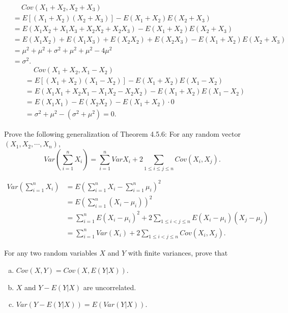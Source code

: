 \documentclass[14pt]{elegantbook}
\begin{document}
    \begin{solution}
        \begin{align*}
            &\quad\ Cov(X_1 + X_2, X_2 + X_3)\\&=E[(X_1 + X_2)(X_2 + X_3)]-E(X_1 + X_2)E(X_2 + X_3)\\
            &=E(X_1X_2 + X_1X_3 + X_2X_2 + X_2X_3)-E(X_1 + X_2)E(X_2 + X_3)\\
            &=E(X_1X_2) + E(X_1X_3) + E(X_2X_2) + E(X_2X_3) - E(X_1 + X_2)E(X_2 + X_3)\\
            &=\mu^2+\mu^2+\sigma^2+\mu^2+\mu^2-4\mu^2\\
            &=\sigma^2.
        \end{align*}
        \begin{align*}
            &\quad\ Cov(X_1 + X_2, X_1 - X_2)\\
            &=E[(X_1 + X_2)(X_1 - X_2)]-E(X_1 + X_2)E(X_1 - X_2)\\
            &=E(X_1X_1 + X_2X_1 - X_1X_2 - X_2X_2) - E(X_1 + X_2)E(X_1 - X_2)\\
            &=E(X_1X_1) - E(X_2X_2) - E(X_1 + X_2)\cdot 0\\
            &=\sigma^2+\mu^2-(\sigma^2+\mu^2)=0. 
        \end{align*}
    \end{solution}


    \setcounter{exer}{43}
    \begin{exercise}
        Prove the following generalization of Theorem 4.5.6: For any random vector $(X_1, X_2, \cdots, X_n)$, 
        \[Var\left(\sum_{i=1}^nX_i\right)=\sum_{i=1}^nVar X_i+2\sum_{1\leq i\leq j\leq n}Cov(X_i, X_j). \]
    \end{exercise}

    \begin{solution}
        \begin{align*}
            Var\left(\sum_{i=1}^n X_i\right)&=E\left(\sum_{i=1}^n X_i-\sum_{i=1}^n\mu_i\right)^2\\
            &=E\left(\sum_{i=1}^n (X_i-\mu_i)\right)^2\\
            &=\sum_{i=1}^nE(X_i-\mu_i)^2+2\sum_{1\leq i< j\leq n}E(X_i-\mu_i)(X_j-\mu_j)\\
            &=\sum_{i=1}^nVar(X_i)+2\sum_{1\leq i< j\leq n}Cov(X_i, X_j).
        \end{align*}
    \end{solution}

    \setcounter{exer}{57}
    \begin{exercise}
        For any two random variables $X$ and $Y$ with finite variances, prove that 
        \begin{enumerate}[(a)]
            \item \(Cov(X, Y)=Cov(X, E(Y|X))\). 
            \item $X$ and $Y-E(Y|X)$ are uncorrelated. 
            \item $Var(Y-E(Y|X)) = E(Var(Y|X))$. 
        \end{enumerate}
    \end{exercise}
\end{document}
